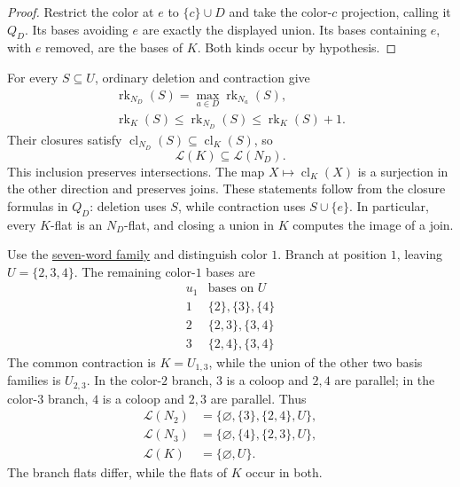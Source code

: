 \begin{proof}
Restrict the color at $e$ to $\{c\}\cup D$ and take the color-$c$
projection, calling it $Q_D$. Its bases avoiding $e$ are exactly the
displayed union. Its bases containing $e$, with $e$ removed, are
the bases of $K$. Both kinds occur by hypothesis.
\end{proof}

For every $S\subseteq U$, ordinary deletion and contraction give
\[
 \begin{gathered}
 \operatorname{rk}_{N_D}(S)=\max_{a\in D}\operatorname{rk}_{N_a}(S),\\
 \operatorname{rk}_K(S)\leq\operatorname{rk}_{N_D}(S)
 \leq\operatorname{rk}_K(S)+1.
 \end{gathered}
\]
Their closures satisfy $\operatorname{cl}_{N_D}(S)\subseteq
\operatorname{cl}_K(S)$, so
\[
 \mathcal L(K)\subseteq\mathcal L(N_D).
\]
This inclusion preserves intersections. The map
$X\mapsto\operatorname{cl}_K(X)$ is a surjection in the other
direction and preserves joins. These statements follow from the
closure formulas in $Q_D$: deletion uses $S$, while contraction uses
$S\cup\{e\}$. In particular, every $K$-flat is an $N_D$-flat, and
closing a union in $K$ computes the image of a join.

\begin{example}
Use the \href{independence.htm#mixedCircuits}{seven-word family} and
distinguish color $1$. Branch at position $1$, leaving
$U=\{2,3,4\}$. The remaining color-$1$ bases are
\[
 \begin{array}{c|c}
 u_1&\text{bases on }U\\ \hline
 1&\{2\},\{3\},\{4\}\\
 2&\{2,3\},\{3,4\}\\
 3&\{2,4\},\{3,4\}
 \end{array}
\]
The common contraction is $K=U_{1,3}$, while the union of the other
two basis families is $U_{2,3}$. In the color-$2$ branch, $3$ is a
coloop and $2,4$ are parallel; in the color-$3$ branch, $4$ is a
coloop and $2,3$ are parallel. Thus
\[
 \begin{aligned}
 \mathcal L(N_2)&=\{\varnothing,\{3\},\{2,4\},U\},\\
 \mathcal L(N_3)&=\{\varnothing,\{4\},\{2,3\},U\},\\
 \mathcal L(K)&=\{\varnothing,U\}.
 \end{aligned}
\]
The branch flats differ, while the flats of $K$ occur in both.
\end{example}

